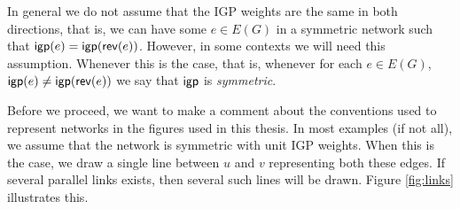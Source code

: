 In general we do not assume that the IGP weights are the same in both directions,
that is, we can have some $e \in E(G)$ in a symmetric network such that $\mathsf{igp}(e) = \mathsf{igp}(\mathsf{rev}(e))$.
However, in some contexts we will need this assumption. Whenever this is the case, that is, whenever for each
$e \in E(G)$, $\mathsf{igp}(e) \neq \mathsf{igp}(\mathsf{rev}(e))$ we say that $\mathsf{igp}$ is \emph{symmetric}.

Before we proceed, we want to make a comment about the conventions used to represent networks in the figures used in this
thesis. In most examples (if not all), we assume that the network is symmetric with unit IGP weights. When this is the case, we draw a single
line between $u$ and $v$ representing both these edges. If several parallel links exists, then several such
lines will be drawn. Figure \ref{fig:links} illustrates this.

